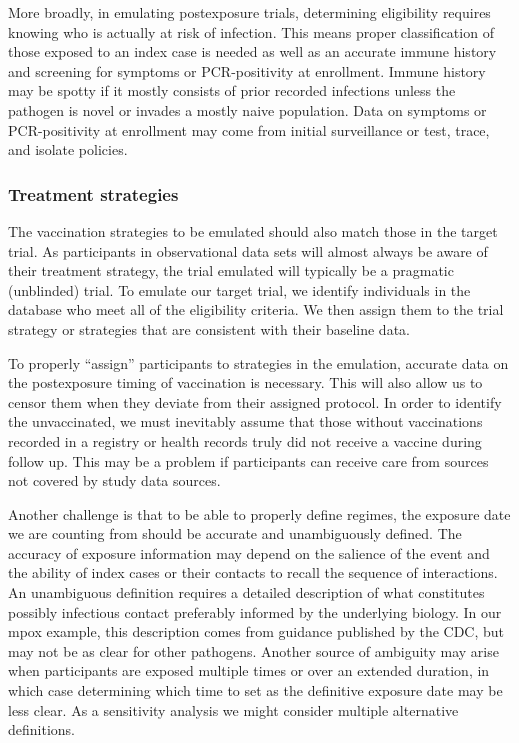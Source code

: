 \documentclass[11pt]{article}
\begin{document}
More broadly, in emulating postexposure trials, determining eligibility requires knowing who is actually at risk of infection. This means proper classification of those exposed to an index case is needed as well as an accurate immune history and screening for symptoms or PCR-positivity at enrollment. Immune history may be spotty if it mostly consists of prior recorded infections unless the pathogen is novel or invades a mostly naive population. Data on symptoms or PCR-positivity at enrollment may come from initial surveillance or test, trace, and isolate policies. 

\subsubsection*{Treatment strategies}
The vaccination strategies to be emulated should also match those in the target trial. As participants in observational data sets will almost always be aware of their treatment strategy, the trial emulated will typically be a pragmatic (unblinded) trial. To emulate our target trial, we identify individuals in the database who meet all of the eligibility criteria. We then assign them to the trial strategy or strategies that are consistent with their baseline data.

To properly ``assign'' participants to strategies in the emulation, accurate data on the postexposure timing of vaccination is necessary. This will also allow us to censor them when they deviate from their assigned protocol. In order to identify the unvaccinated, we must inevitably assume that those without vaccinations recorded in a registry or health records truly did not receive a vaccine during follow up. This may be a problem if participants can receive care from sources not covered by study data sources. 

Another challenge is that to be able to properly define regimes, the exposure date we are counting from should be accurate and unambiguously defined. The accuracy of exposure information may depend on the salience of the event and the ability of index cases or their contacts to recall the sequence of interactions. An unambiguous definition requires a detailed description of what constitutes possibly infectious contact preferably informed by the underlying biology. In our mpox example, this description comes from guidance published by the CDC, but may not be as clear for other pathogens. Another source of ambiguity may arise when participants are exposed multiple times or over an extended duration, in which case determining which time to set as the definitive exposure date may be less clear. As a sensitivity analysis we might consider multiple alternative definitions.
\end{document}
